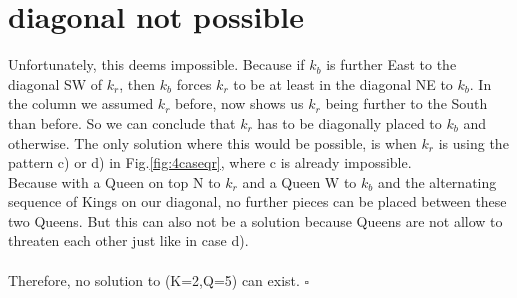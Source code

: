 \documentclass[a4paper,oneside]{scrarticle}
\begin{document}
	\section{diagonal not possible}
	Unfortunately, this deems impossible. Because if $k_b$ is further East to the diagonal SW of $k_r$, then $k_b$ forces $k_r$ to be at least in the diagonal NE to $k_b$. In the column we assumed $k_r$ before, now shows us $k_r$ being further to the South than before. So we can conclude that $k_r$ has to be diagonally placed to $k_b$ and otherwise. The only solution where this would be possible, is when $k_r$ is using the pattern c) or d) in Fig.\ref{fig:4caseqr}, where c is already impossible.\\
	Because with a Queen on top N to $k_r$ and a Queen W to $k_b$ and the alternating sequence of Kings on our diagonal, no further pieces can be placed between these two Queens. But this can also not be a solution because Queens are not allow to threaten each other just like in case d).\\
	\\
	Therefore, no solution to (K=2,Q=5) can exist. \qquad\qquad\qquad\qquad\qquad\qquad$\square$
	
\end{document}
